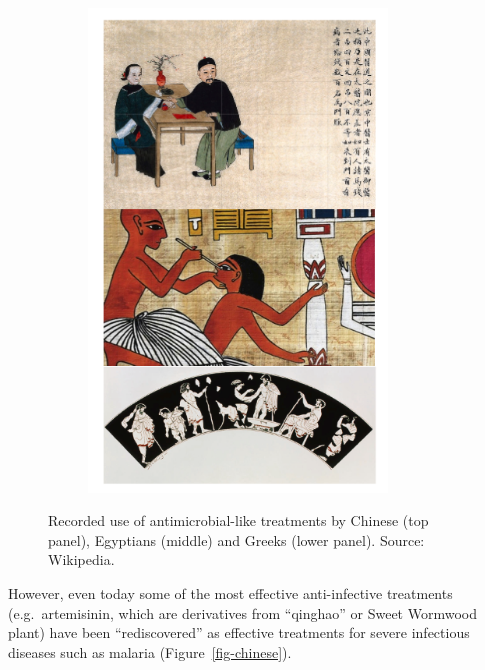 \documentclass[
  letterpaper,
  DIV=11,
  numbers=noendperiod]{scrreprt}
\begin{document}
\begin{figure}

{\centering 

\begin{figure}

{\centering \includegraphics[width=3.125in,height=\textheight]{images/ancient.png}

}

\end{figure}

}

\caption{\label{fig-ancient}Recorded use of antimicrobial-like
treatments by Chinese (top panel), Egyptians (middle) and Greeks (lower
panel). Source: Wikipedia.}

\end{figure}

However, even today some of the most effective anti-infective treatments
(e.g.~artemisinin, which are derivatives from ``qinghao'' or Sweet
Wormwood plant) have been ``rediscovered'' as effective treatments for
severe infectious diseases such as malaria (Figure~\ref{fig-chinese}).
\end{document}
